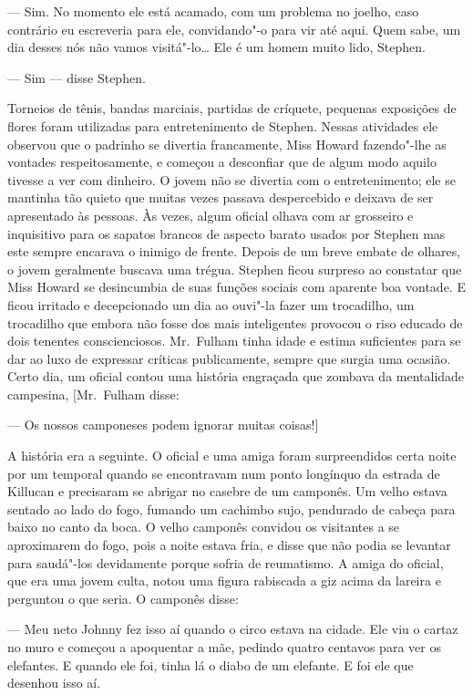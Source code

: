 --- Sim.  No momento ele está acamado, com um problema no joelho,
caso contrário eu escreveria para ele, convidando"-o para vir até aqui. 
Quem sabe, um dia desses nós não vamos visitá"-lo\ldots{}  Ele é um homem
muito lido, Stephen.

--- Sim --- disse Stephen.

Torneios de tênis, bandas marciais, partidas de críquete, pequenas
exposições de flores foram utilizadas para entretenimento
de Stephen.  Nessas atividades ele observou que o padrinho se divertia
francamente, Miss Howard fazendo"-lhe as vontades respeitosamente, e
começou a desconfiar que de algum modo aquilo tivesse a ver com
dinheiro.  O jovem não se divertia com o entretenimento; ele se
mantinha tão quieto que muitas vezes passava despercebido e deixava de
ser apresentado às pessoas.  Às vezes, algum oficial olhava com ar
grosseiro e inquisitivo para os sapatos brancos de aspecto barato
usados por Stephen mas este sempre encarava o inimigo de frente. 
Depois de um breve embate de olhares, o jovem geralmente buscava uma
trégua.  Stephen ficou surpreso ao constatar que Miss Howard se
desincumbia de suas funções sociais com aparente boa vontade.  E ficou
irritado e decepcionado um dia ao ouvi"-la fazer um trocadilho, um
trocadilho que embora não fosse dos mais inteligentes provocou
o riso educado de dois tenentes conscienciosos.  Mr.~Fulham tinha idade
e estima suficientes para se dar ao luxo de expressar críticas
publicamente, sempre que surgia uma ocasião. Certo dia, um
oficial contou uma história engraçada que zombava da mentalidade
campesina, [Mr.~Fulham disse:

--- Os nossos camponeses podem ignorar muitas coisas!]

A história era a seguinte.  O oficial e uma amiga foram
surpreendidos certa noite por um temporal quando se encontravam num
ponto longínquo da estrada de Killucan e precisaram se abrigar no
casebre de um camponês.  Um velho estava sentado ao lado do fogo,
fumando um cachimbo sujo, pendurado de cabeça para baixo no canto da
boca.  O velho camponês convidou os visitantes a se aproximarem do
fogo, pois a noite estava fria, e disse que não podia se levantar para
saudá"-los devidamente porque sofria de reumatismo.  A amiga do oficial,
que era uma jovem culta, notou uma figura rabiscada a giz acima da
lareira e perguntou o que seria.  O camponês disse:

--- Meu neto Johnny fez isso aí quando o circo estava na cidade. 
Ele viu o cartaz no muro e começou a apoquentar a mãe, pedindo quatro
centavos para ver os elefantes.  E quando ele foi, tinha lá o diabo de
um elefante.  E foi ele que desenhou isso aí.

